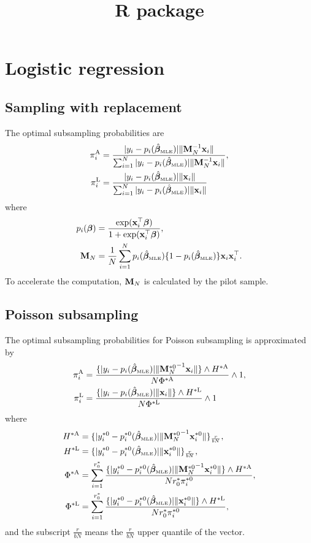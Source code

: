 \documentclass[letterpaper,12pt,hidelinks]{article}
\title{R package}
\author{}
\date{}
\begin{document}
\maketitle

\section{Logistic regression}

\subsection{Sampling with replacement}

The optimal subsampling probabilities are
\begin{align*}
    \pi_i^{\mathrm{A}} &= \frac{|y_i - p_i(\hat{\boldsymbol{\beta}}_{\textnormal{\tiny MLE}})|\|\mathbf{M}_N^{-1}\mathbf{x}_i\|}{\sum_{i=1}^{N} |y_i - p_i(\hat{\boldsymbol{\beta}}_{\textnormal{\tiny MLE}})|\|\mathbf{M}_N^{-1}\mathbf{x}_i\|}, \\
    \pi_i^{\mathrm{L}} &= \frac{|y_i - p_i(\hat{\boldsymbol{\beta}}_{\textnormal{\tiny MLE}})|\|\mathbf{x}_i\|}{\sum_{i=1}^{N} |y_i - p_i(\hat{\boldsymbol{\beta}}_{\textnormal{\tiny MLE}})|\|\mathbf{x}_i\|}\\
\end{align*}
where
\begin{align*}
    p_i(\boldsymbol{\beta}) &= \frac{\exp(\mathbf{x}_i^{\top} \boldsymbol{\beta})}{1 + \exp(\mathbf{x}_i^{\top} \boldsymbol{\beta})}, \\
    \mathbf{M}_N &= \frac{1}{N} \sum_{i=1}^{N} p_i(\hat{\boldsymbol{\beta}}_{\textnormal{\tiny MLE}})\{1 - p_i(\hat{\boldsymbol{\beta}}_{\textnormal{\tiny MLE}})\} \mathbf{x}_i\mathbf{x}_i^{\top}.
\end{align*}
To accelerate the computation, $\mathbf{M}_N$ is calculated by the pilot sample.

\subsection{Poisson subsampling}

The optimal subsampling probabilities for Poisson subsampling is approximated by
\begin{align*}
    \pi_i^{\mathrm{A}} &= \frac{\{|y_i - p_i(\hat{\boldsymbol{\beta}}_{\textnormal{\tiny MLE}})|\|{\mathbf{M}_N^{*0}}^{-1}\mathbf{x}_i\|\}\wedge H^{*{\mathrm{A}}}}{N\Phi^{*{\mathrm{A}}}} \wedge 1,\\
    \pi_i^{\mathrm{L}} &= \frac{\{|y_i - p_i(\hat{\boldsymbol{\beta}}_{\textnormal{\tiny MLE}})|\|\mathbf{x}_i\|\} \wedge H^{*{\mathrm{L}}}}{N\Phi^{*{\mathrm{L}}}} \wedge 1\\
\end{align*}
where
\begin{align*}
    H^{*{\mathrm{A}}} &= \{|y_i^{*0} - p_i^{*0}(\hat{\boldsymbol{\beta}}_{\textnormal{\tiny MLE}})|\|{\mathbf{M}_N^{*0}}^{-1}\mathbf{x}_i^{*0}\|\}_{\frac{r}{bN}}, \\
    H^{*{\mathrm{L}}} &= \{|y_i^{*0} - p_i^{*0}(\hat{\boldsymbol{\beta}}_{\textnormal{\tiny MLE}})|\|\mathbf{x}_i^{*0}\|\}_{\frac{r}{bN}}, \\
    \Phi^{*{\mathrm{A}}} &= \sum_{i=1}^{r_0^*} \frac{\{|y_i^{*0} - p_i^{*0}(\hat{\boldsymbol{\beta}}_{\textnormal{\tiny MLE}})|\|{\mathbf{M}_N^{*0}}^{-1}\mathbf{x}_i^{*0}\|\} \wedge H^{*{\mathrm{A}}}}{N r_0^* \pi_i^{*0}}, \\
    \Phi^{*{\mathrm{L}}} &= \sum_{i=1}^{r_0^*} \frac{\{|y_i^{*0} - p_i^{*0}(\hat{\boldsymbol{\beta}}_{\textnormal{\tiny MLE}})|\|\mathbf{x}_i^{*0}\|\} \wedge H^{*{\mathrm{L}}}}{N r_0^* \pi_i^{*0}},
\end{align*}
and the subscript $\frac{r}{bN}$ means the $\frac{r}{bN}$ upper quantile of the vector.
\end{document}
